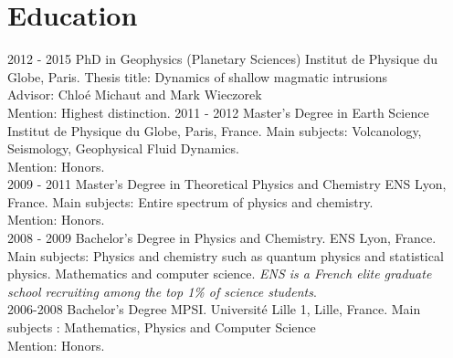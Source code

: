 \documentclass[]{friggeri-cv}
\begin{document}
\section{Education}
\begin{entrylist}
  \entry
  {2012 - 2015}
  {PhD in Geophysics (Planetary Sciences)}
  {Institut de Physique du Globe, Paris.}
  {Thesis title: Dynamics of shallow magmatic intrusions\\
    Advisor: Chloé Michaut and Mark Wieczorek\\
    Mention: Highest distinction.}
  \entry
  {2011 - 2012}
  {Master's Degree in Earth Science}
  {Institut de Physique du Globe, Paris, France.}
  {Main subjects: Volcanology, Seismology, Geophysical Fluid Dynamics.\\
    Mention: Honors. \\}
  \entry
  {2009 - 2011}
  {Master's Degree in Theoretical Physics and Chemistry}
  {ENS Lyon, France.}
  {Main subjects: Entire spectrum of physics and chemistry.\\
    Mention: Honors.\\}
  \entry
  {2008 - 2009}
  {Bachelor's Degree in Physics and Chemistry.}
  {ENS Lyon, France.}
  {Main subjects: Physics and chemistry such as quantum physics and statistical physics.  Mathematics and computer science. \emph{ENS is a French elite graduate school recruiting among the top 1\% of science students}.\\}
  \entry
  {2006-2008}
  {Bachelor's Degree MPSI.}
  {Université Lille 1, Lille, France.}
  {Main subjects : Mathematics, Physics and Computer Science\\
    Mention: Honors.}
\end{entrylist}

\newpage
\end{document}
